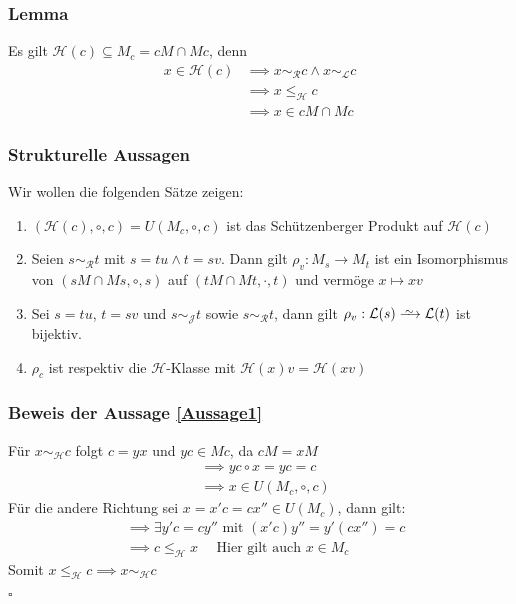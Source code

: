 \documentclass[12pt, german]{article}
\newcommand\iso{\xrightarrow{
		\,\smash{\raisebox{-0.65ex}{\ensuremath{\scriptstyle\sim}}}\,}}
\newcommand{\grel}{\sim_{\mathcal{L}}}
\newcommand{\grer}{\sim_{\mathcal{R}}}
\newcommand{\grej}{\sim_{\mathcal{J}}}
\newcommand{\greh}{\sim_{\mathcal{H}}}
\newcommand{\lgreheq}{\leqslant_{\mathcal{H}}}
\newcommand{\lcal}{\mathcal L}
\newcommand{\hcal}{\mathcal H}
\newcommand{\bewiesen}{
	
	\begin{flushright}
		$\square$  \\
\end{flushright}}
\begin{document}
	\subsubsection{Lemma}
	Es gilt $\hcal(c) \subseteq M_c = cM \cap Mc$, denn 
	\begin{align*}
		x \in \hcal(c) &\implies x \grer c \land x \grel c \\ 
		&\implies x \lgreheq c \\ 
		&\implies x \in cM \cap Mc
	\end{align*}
	
	\subsubsection{Strukturelle Aussagen}
	Wir wollen die folgenden Sätze zeigen:
	\begin{enumerate}[label = \alph*)]
		\item  \label{Aussage1}$(\hcal(c), \circ, c) = U(M_c, \circ, c)$ ist das Schützenberger Produkt auf $\hcal(c)$
		\item  \label{Aussage2} Seien $s \grer t$ mit $s = tu \land t = sv$. Dann gilt $\rho_v: M_s \to M_t$ ist ein Isomorphismus von $(sM \cap Ms, \circ, s)$ auf $(tM \cap Mt, \cdot, t)$ und vermöge $x \mapsto xv$
		\item  \label{Aussage3} Sei $s = tu$, $t = sv$ und $s \grej t$ sowie $s \grer t$, dann gilt $\rho_v: \lcal(s) \iso \lcal(t)$ ist bijektiv. 
		\item  \label{Aussage4} $\rho_c$ ist respektiv die $\hcal$-Klasse mit $\hcal(x)v = \hcal(xv)$
	\end{enumerate}
	
	\subsubsection{Beweis der Aussage \ref{Aussage1}}
	Für $x \greh c $ folgt $c = yx$ und $yc \in Mc$, da $cM = xM$
	\begin{align*}
		&\implies yc \circ x = yc = c \\
		&\implies x \in U(M_c, \circ, c)
	\end{align*}
	Für die andere Richtung sei $x = x'c = cx'' \in U(M_c)$, dann gilt: 
	\begin{align*}
		&\implies \exists y'c = c y'' \text{ mit } (x'c)y'' = y'(cx'') =c \\
		&\implies c \lgreheq x \quad\text{ Hier gilt auch } x \in M_c
	\end{align*}
	Somit $x \lgreheq c \implies x \greh c$
	\bewiesen
	
\end{document}
